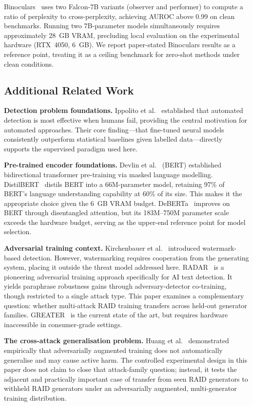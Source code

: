 \documentclass[conference]{IEEEtran}
\begin{document}
Binoculars~\cite{hans2024} uses two Falcon-7B variants (observer and
performer) to compute a ratio of perplexity to cross-perplexity, achieving
AUROC above 0.99 on clean benchmarks. Running two 7B-parameter models
simultaneously requires approximately 28~GB VRAM, precluding local
evaluation on the experimental hardware (RTX~4050, 6~GB). We report
paper-stated Binoculars results as a reference point, treating it as a
ceiling benchmark for zero-shot methods under clean conditions.

\subsection{Additional Related Work}

\textbf{Detection problem foundations.} Ippolito et al.~\cite{ippolito2020}
established that automated detection is most effective when humans
fail, providing the central motivation for automated approaches. Their core
finding---that fine-tuned neural models consistently outperform statistical
baselines given labelled data---directly supports the supervised paradigm
used here.

\textbf{Pre-trained encoder foundations.} Devlin et al.~\cite{devlin2019}
(BERT) established bidirectional transformer pre-training via masked language
modelling. DistilBERT~\cite{sanh2019} distils BERT into a 66M-parameter model,
retaining 97\% of BERT's language understanding capability at 60\% of its size.
This makes it the appropriate choice given the 6~GB VRAM budget.
DeBERTa~\cite{he2021} improves on BERT through disentangled attention, but
its 183M--750M parameter scale exceeds the hardware budget, serving as the
upper-end reference point for model selection.

\textbf{Adversarial training context.} Kirchenbauer et al.~\cite{kirchenbauer2023}
introduced watermark-based detection. However, watermarking requires cooperation
from the generating system, placing it outside the threat model addressed here.
RADAR~\cite{hu2023} is a pioneering adversarial training approach specifically for
AI text detection. It yields paraphrase robustness gains through
adversary-detector co-training, though restricted to a single attack type.
This paper examines a complementary question: whether multi-attack RAID
training transfers across held-out generator families. GREATER~\cite{li2025}
is the current state of the art, but requires
hardware inaccessible in consumer-grade settings.

\textbf{The cross-attack generalisation problem.} Huang et al.~\cite{huang2024}
demonstrated empirically that adversarially augmented training does not
automatically generalise and may cause active harm. The controlled experimental
design in this paper does not claim to close that attack-family question;
instead, it tests the adjacent and practically important case of transfer from
seen RAID generators to withheld RAID generators under an adversarially augmented, multi-generator
training distribution.
\end{document}
